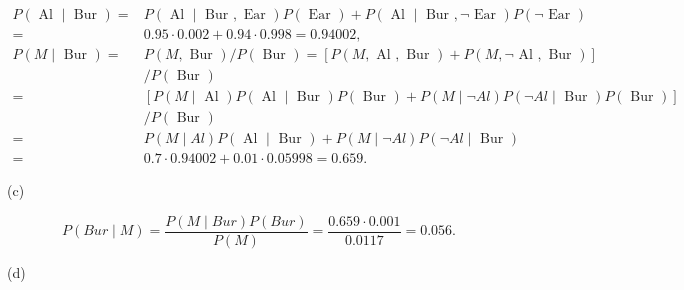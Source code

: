 \documentclass[10pt]{book}
\begin{document}
$$
\begin{aligned}
P(\text { Al } \mid \text { Bur })= & P(\text { Al } \mid \text { Bur }, \text { Ear }) P(\text { Ear })+P(\text { Al } \mid \text { Bur }, \neg \text { Ear }) P(\neg \text { Ear }) \\
= & 0.95 \cdot 0.002+0.94 \cdot 0.998=0.94002, \\
P(M \mid \text { Bur })= & P(M, \text { Bur }) / P(\text { Bur })=[P(M, \text { Al }, \text { Bur })+P(M, \neg \text { Al }, \text { Bur })] \\
& / P(\text { Bur }) \\
= & {[P(M \mid \text { Al }) P(\text { Al } \mid \text { Bur }) P(\text { Bur })+P(M \mid \neg A l) P(\neg A l \mid \text { Bur }) P(\text { Bur })] } \\
& / P(\text { Bur }) \\
= & P(M \mid A l) P(\text { Al } \mid \text { Bur })+P(M \mid \neg A l) P(\neg A l \mid \text { Bur }) \\
= & 0.7 \cdot 0.94002+0.01 \cdot 0.05998=0.659 .
\end{aligned}
$$

(c)

$$
P(B u r \mid M)=\frac{P(M \mid B u r) P(B u r)}{P(M)}=\frac{0.659 \cdot 0.001}{0.0117}=0.056 .
$$

(d)
\end{document}

